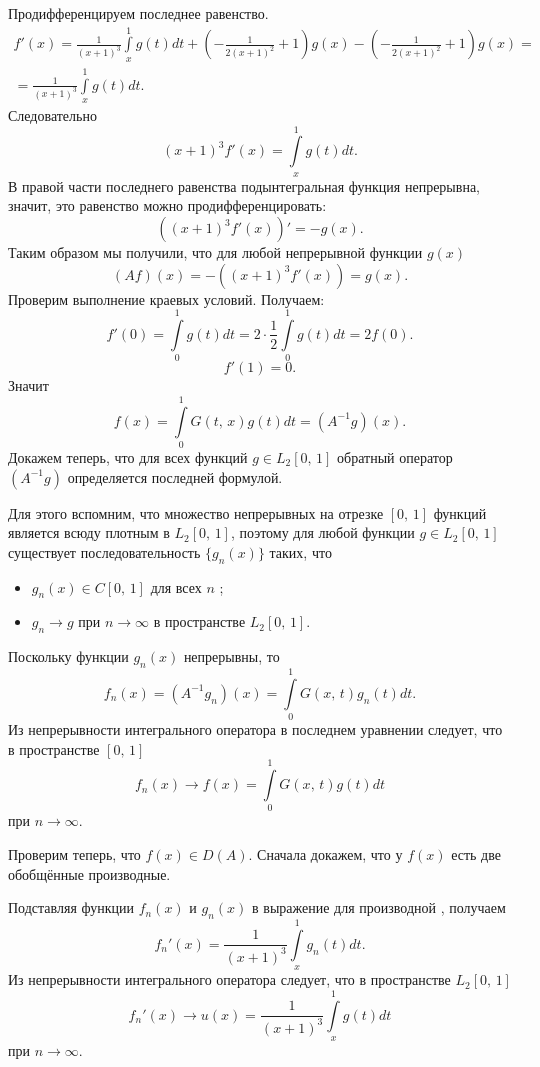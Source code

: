 \documentclass[a4paper]{article}
\begin{document}
\begin{sol}
Продифференцируем последнее равенство.
\begin{multline*}
	f'(x)= \frac{1}{(x+1)^3} \int\limits_{x}^{1} g(t)dt+
	\left( -\frac{1}{2(x+1)^2}+1 \right) g( x ) -
	\left( -\frac{1}{2(x+1)^2}+1 \right) g(x)=\\=
	\frac{1}{(x+1)^3} \int\limits_{x}^{1} g(t)dt 
.\end{multline*} 
Следовательно
\[
	(x+1)^3 f'(x)= \int\limits_{x}^{1} g(t)dt 
.\] 
В правой части последнего равенства подынтегральная функция
непрерывна, значит, это равенство можно продифференцировать:
\[
	\left( (x+1)^3 f'(x) \right) '=-g(x)
.\] 
Таким образом мы получили, что для любой непрерывной функции
$g(x)$ 
\[
	(Af)(x)= -\left( (x+1)^3 f'(x) \right) =g(x)
.\] 
Проверим выполнение краевых условий. Получаем:
\[
	f'(0)= \int\limits_{0}^{1} g(t)dt=2\cdot  \frac{1}{2}  \int\limits_{0}^{1} g(t)dt=2f(0)  
.\] 
\[
	f'(1)=0
.\] 
Значит
\[
	f(x)= \int\limits_{0}^{1} G(t,\,x)g(t)dt=
	(A^{-1}g)(x)
.\] 
Докажем теперь, что для всех функций $g \in L_2[0,\,1]$ обратный
оператор $(A^{-1}g)$ определяется последней формулой.

Для этого вспомним, что множество непрерывных на отрезке $[0,\,1]$
функций является всюду плотным в $L_2[0,\,1]$, поэтому для любой
функции $g \in L_2[0,\,1]$ существует последовательность
$\{g_n(x)\} $ таких, что
\begin{itemize}
	\item $\displaystyle g_n (x) \in  C[0,\,1]$ для всех $n$ ;
		\item $g_n\to g$ при $n\to \infty$ в пространстве
			$L_2[0,\,1]$.
\end{itemize}
Поскольку функции $g_n(x)$ непрерывны, то
\[
	f_n(x)= \left( A^{-1}g_n \right) (x)= \int\limits_{0}^{1} G(x,\,t)g_n(t)dt 
.\] 
Из непрерывности интегрального оператора в последнем уравнении
следует, что в пространстве $[0,\,1]$ 
\[
	f_n(x)\to f(x)= \int\limits_{0}^{1} G(x,\,t)g(t)dt 
\]
при $n\to \infty$.

Проверим теперь, что $f(x) \in D(A)$. Сначала докажем, что у
$f(x)$ есть две обобщённые производные.

Подставляя функции $f_n(x)$ и $g_n(x)$ в выражение для производной
, получаем
\[
	f_n'(x)= \frac{1}{(x+1)^3}\int\limits_{x}^{1} g_n(t)dt 
.\] 
Из непрерывности интегрального оператора следует, что в пространстве $L_2[0,\,1]$ 
\[
	f_n'(x)\to u(x)= \frac{1}{(x+1)^3} \int\limits_{x}^{1} g(t)dt 
\]
при $n\to \infty$.


\end{sol}
\end{document}
